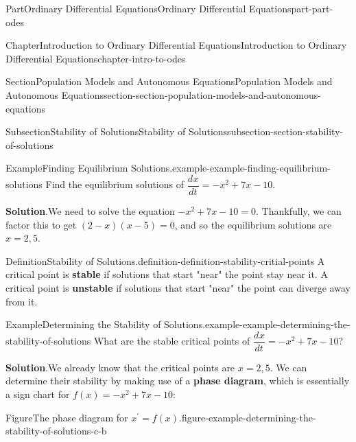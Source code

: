 \documentclass[twoside,10pt,]{book}
\newcommand{\blocktitlefont}{\relax}
\newcommand{\terminology}[1]{\textbf{#1}}
\numberwithin{equation}{part}
\newcommand{\dv}[3][]{\dfrac{d^{#1} #2}{d #3^{#1}}}
\begin{document}
\begin{partptx}{Part}{Ordinary Differential Equations}{}{Ordinary Differential Equations}{}{}{part-part-odes}
\begin{chapterptx}{Chapter}{Introduction to Ordinary Differential Equations}{}{Introduction to Ordinary Differential Equations}{}{}{chapter-intro-to-odes}
\begin{sectionptx}{Section}{Population Models and Autonomous Equations}{}{Population Models and Autonomous Equations}{}{}{section-section-population-models-and-autonomous-equations}
\begin{subsectionptx}{Subsection}{Stability of Solutions}{}{Stability of Solutions}{}{}{subsection-section-stability-of-solutions}
\begin{example}{Example}{Finding Equilibrium Solutions.}{example-example-finding-equilibrium-solutions}%
Find the equilibrium solutions of \(\dv{x}{t} = -x^{2} + 7x - 10\).%
\par\smallskip%
\noindent\textbf{\blocktitlefont Solution}.\hypertarget{solution-example-finding-equilibrium-solutions-c}{}\quad{}We need to solve the equation \(-x^{2} + 7x - 10 = 0\). Thankfully, we can factor this to get \((2-x)(x-5) = 0\), and so the equilibrium solutions are \(x = 2,5\).%
\end{example}
\begin{definition}{Definition}{Stability of Solutions.}{definition-definition-stability-critial-points}%
A critical point is \terminology{stable} if solutions that start "near" the point stay near it. A critical point is \terminology{unstable} if solutions that start "near" the point can diverge away from it.%
\end{definition}
\begin{example}{Example}{Determining the Stability of Solutions.}{example-example-determining-the-stability-of-solutions}%
What are the stable critical points of \(\dv{x}{t} = -x^{2} + 7x - 10\)?%
\par\smallskip%
\noindent\textbf{\blocktitlefont Solution}.\hypertarget{solution-example-determining-the-stability-of-solutions-c}{}\quad{}We already know that the critical points are \(x = 2, 5\). We can determine their stability by making use of a \terminology{phase diagram}, which is essentially a sign chart for \(f(x) = -x^{2} + 7x - 10\):%
\begin{figureptx}{Figure}{The phase diagram for \(x^\prime = f(x).\)}{figure-example-determining-the-stability-of-solutions-c-b}{}%
\begin{image}{0.25}{0.5}{0.25}{}%
\end{image}
\end{figureptx}
\end{example}
\end{subsectionptx}
\end{sectionptx}
\end{chapterptx}
\end{partptx}
\end{document}
